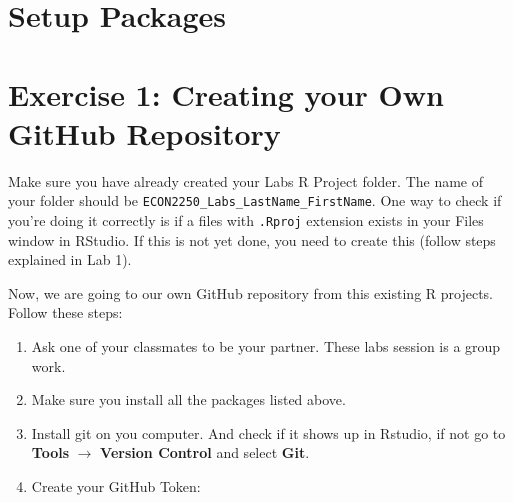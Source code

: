 \documentclass[
  letterpaper,
  DIV=11,
  numbers=noendperiod]{scrartcl}
\newenvironment{Shaded}{\begin{snugshade}}{\end{snugshade}}
\newcommand{\AttributeTok}[1]{\textcolor[rgb]{0.40,0.45,0.13}{#1}}
\newcommand{\CommentTok}[1]{\textcolor[rgb]{0.37,0.37,0.37}{#1}}
\newcommand{\ConstantTok}[1]{\textcolor[rgb]{0.56,0.35,0.01}{#1}}
\newcommand{\ControlFlowTok}[1]{\textcolor[rgb]{0.00,0.23,0.31}{\textbf{#1}}}
\newcommand{\FunctionTok}[1]{\textcolor[rgb]{0.28,0.35,0.67}{#1}}
\newcommand{\NormalTok}[1]{\textcolor[rgb]{0.00,0.23,0.31}{#1}}
\newcommand{\SpecialCharTok}[1]{\textcolor[rgb]{0.37,0.37,0.37}{#1}}
\newcommand{\StringTok}[1]{\textcolor[rgb]{0.13,0.47,0.30}{#1}}
\begin{document}
\section{Setup Packages}\label{setup-packages}


\begin{Shaded}
\end{Shaded}

\section{Exercise 1: Creating your Own GitHub
Repository}\label{exercise-1-creating-your-own-github-repository}

Make sure you have already created your Labs R Project folder. The name
of your folder should be \texttt{ECON2250\_Labs\_LastName\_FirstName}.
One way to check if you're doing it correctly is if a files with
\texttt{.Rproj} extension exists in your Files window in RStudio. If
this is not yet done, you need to create this (follow steps explained in
Lab 1).

Now, we are going to our own GitHub repository from this existing R
projects. Follow these steps:

\begin{enumerate}
\def\labelenumi{\arabic{enumi}.}
\item
  Ask one of your classmates to be your partner. These labs session is a
  group work.
\item
  Make sure you install all the packages listed above.
\item
  Install git on you computer. And check if it shows up in Rstudio, if
  not go to \textbf{Tools} \(\rightarrow\) \textbf{Version Control} and
  select \textbf{Git}.
\item
  Create your GitHub Token:
\end{enumerate}
\end{document}
